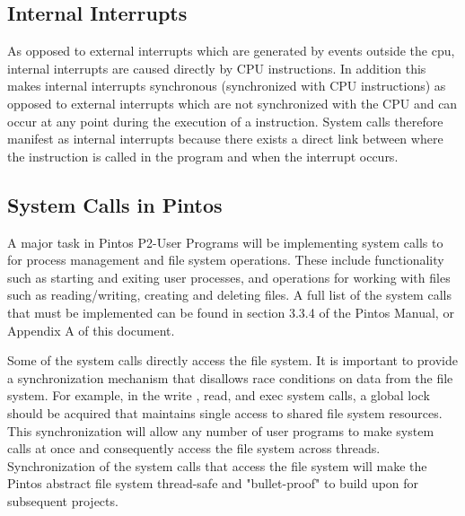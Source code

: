 \documentclass[11pt, letterpaper]{article}
\begin{document}
\subsection{Internal Interrupts}
As opposed to external interrupts which are generated by events outside the cpu, internal interrupts are caused directly by CPU instructions. In addition this makes internal interrupts synchronous (synchronized with CPU instructions) as opposed to external interrupts which are not synchronized with the CPU and can occur at any point during the execution of a instruction. System calls therefore manifest as internal interrupts because there exists a direct link between where the instruction is called in the program and when the interrupt occurs.
\subsection{System Calls in Pintos}
A major task in Pintos P2-User Programs will be implementing system calls to for process management and file system operations. These include functionality such as starting and exiting user processes, and operations for working with files such as reading/writing, creating and deleting files. A full list of the system calls that must be implemented can be found in section 3.3.4 of the Pintos Manual, or Appendix A of this document.

Some of the system calls directly access the file system. It is important to provide a synchronization mechanism that disallows race conditions on data from the file system. For example, in the write , read, and exec  system calls, a global lock should be acquired that maintains single access to shared file system resources. This synchronization will allow any number of user programs to make system calls at once and consequently access the file system across threads. Synchronization of the system calls that access the file system will make the Pintos abstract file system thread-safe and "bullet-proof" to build upon for subsequent projects. 
\end{document}
